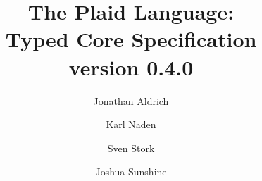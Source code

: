 \documentclass[12pt]{article}
\title{The Plaid Language:\\
Typed Core Specification\\
\vspace{2ex}
version 0.4.0\\
\vspace{2ex}
}
\author{Jonathan Aldrich \and Karl Naden \and Sven Stork \and Joshua Sunshine}
\date{\monthname~\the \year}
\begin{document}
\renewcommand*{\thepage}{title-\arabic{page}} 
\maketitle
\renewcommand*{\thepage}{\arabic{page}} 

















\end{document}
